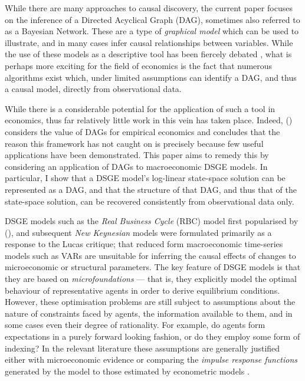 \documentclass{article}
\begin{document}
While there are many approaches to causal discovery, the current paper focuses on the inference of a Directed Acyclical Graph (DAG), sometimes also referred to as a Bayesian Network. These are a type of \textit{graphical model} which can be used to illustrate, and in many cases infer causal relationships between variables. While the use of these models as a descriptive tool has been fiercely debated \parencite{pearl2018book}, what is perhaps more exciting for the field of economics is the fact that numerous algorithms exist which, under limited assumptions can identify a DAG, and thus a causal model, directly from observational data.

While there is a considerable potential for the application of such a tool in economics, thus far relatively little work in this vein has taken place. Indeed, \citeauthor{imbens2019potential} (\citeyear{imbens2019potential}) considers the value of DAGs for empirical economics and concludes that the reason this framework has not caught on is precisely because few useful applications have been demonstrated. This paper aims to remedy this by considering an application of DAGs to macroeconomic DSGE models. In particular, I show that a DSGE model's log-linear state-space solution can be represented as a DAG, and that the structure of that DAG, and thus that of the state-space solution, can be recovered consistently from observational data only. 

DSGE models such as the \textit{Real Business Cycle} (RBC) model first popularised by \citeauthor{kydland1982time} (\citeyear{kydland1982time}), and subsequent \textit{New Keynesian} models were formulated primarily as a response to the Lucas critique; that reduced form macroeconomic time-series models such as VARs are unsuitable for inferring the causal effects of changes to microeconomic or structural parameters. The key feature of DSGE models is that they are based on \textit{microfoundations} --- that is, they explicitly model the optimal behaviour of representative agents in order to derive equilibrium conditions. However, these optimisation problems are still subject to assumptions about the nature of constraints faced by agents, the information available to them, and in some cases even their degree of rationality. For example, do agents form expectations in a purely forward looking fashion, or do they employ some form of indexing? In the relevant literature these assumptions are generally justified either with microeconomic evidence or comparing the \textit{impulse response functions} generated by the model to those estimated by econometric models \parencite{christiano2018on}. 
\end{document}
